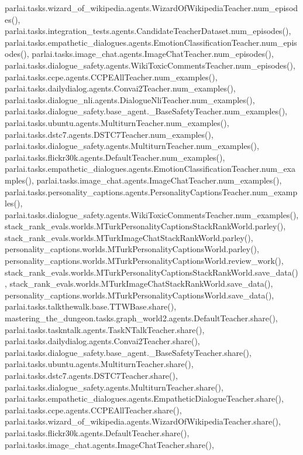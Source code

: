 parlai.\+tasks.\+wizard\+\_\+of\+\_\+wikipedia.\+agents.\+Wizard\+Of\+Wikipedia\+Teacher.\+num\+\_\+episodes(), parlai.\+tasks.\+integration\+\_\+tests.\+agents.\+Candidate\+Teacher\+Dataset.\+num\+\_\+episodes(), parlai.\+tasks.\+empathetic\+\_\+dialogues.\+agents.\+Emotion\+Classification\+Teacher.\+num\+\_\+episodes(), parlai.\+tasks.\+image\+\_\+chat.\+agents.\+Image\+Chat\+Teacher.\+num\+\_\+episodes(), parlai.\+tasks.\+dialogue\+\_\+safety.\+agents.\+Wiki\+Toxic\+Comments\+Teacher.\+num\+\_\+episodes(), parlai.\+tasks.\+ccpe.\+agents.\+C\+C\+P\+E\+All\+Teacher.\+num\+\_\+examples(), parlai.\+tasks.\+dailydialog.\+agents.\+Convai2\+Teacher.\+num\+\_\+examples(), parlai.\+tasks.\+dialogue\+\_\+nli.\+agents.\+Dialogue\+Nli\+Teacher.\+num\+\_\+examples(), parlai.\+tasks.\+dialogue\+\_\+safety.\+base\+\_\+agent.\+\_\+\+Base\+Safety\+Teacher.\+num\+\_\+examples(), parlai.\+tasks.\+ubuntu.\+agents.\+Multiturn\+Teacher.\+num\+\_\+examples(), parlai.\+tasks.\+dstc7.\+agents.\+D\+S\+T\+C7\+Teacher.\+num\+\_\+examples(), parlai.\+tasks.\+dialogue\+\_\+safety.\+agents.\+Multiturn\+Teacher.\+num\+\_\+examples(), parlai.\+tasks.\+flickr30k.\+agents.\+Default\+Teacher.\+num\+\_\+examples(), parlai.\+tasks.\+empathetic\+\_\+dialogues.\+agents.\+Emotion\+Classification\+Teacher.\+num\+\_\+examples(), parlai.\+tasks.\+image\+\_\+chat.\+agents.\+Image\+Chat\+Teacher.\+num\+\_\+examples(), parlai.\+tasks.\+personality\+\_\+captions.\+agents.\+Personality\+Captions\+Teacher.\+num\+\_\+examples(), parlai.\+tasks.\+dialogue\+\_\+safety.\+agents.\+Wiki\+Toxic\+Comments\+Teacher.\+num\+\_\+examples(), stack\+\_\+rank\+\_\+evals.\+worlds.\+M\+Turk\+Personality\+Captions\+Stack\+Rank\+World.\+parley(), stack\+\_\+rank\+\_\+evals.\+worlds.\+M\+Turk\+Image\+Chat\+Stack\+Rank\+World.\+parley(), personality\+\_\+captions.\+worlds.\+M\+Turk\+Personality\+Captions\+World.\+parley(), personality\+\_\+captions.\+worlds.\+M\+Turk\+Personality\+Captions\+World.\+review\+\_\+work(), stack\+\_\+rank\+\_\+evals.\+worlds.\+M\+Turk\+Personality\+Captions\+Stack\+Rank\+World.\+save\+\_\+data(), stack\+\_\+rank\+\_\+evals.\+worlds.\+M\+Turk\+Image\+Chat\+Stack\+Rank\+World.\+save\+\_\+data(), personality\+\_\+captions.\+worlds.\+M\+Turk\+Personality\+Captions\+World.\+save\+\_\+data(), parlai.\+tasks.\+talkthewalk.\+base.\+T\+T\+W\+Base.\+share(), mastering\+\_\+the\+\_\+dungeon.\+tasks.\+graph\+\_\+world2.\+agents.\+Default\+Teacher.\+share(), parlai.\+tasks.\+taskntalk.\+agents.\+Task\+N\+Talk\+Teacher.\+share(), parlai.\+tasks.\+dailydialog.\+agents.\+Convai2\+Teacher.\+share(), parlai.\+tasks.\+dialogue\+\_\+safety.\+base\+\_\+agent.\+\_\+\+Base\+Safety\+Teacher.\+share(), parlai.\+tasks.\+ubuntu.\+agents.\+Multiturn\+Teacher.\+share(), parlai.\+tasks.\+dstc7.\+agents.\+D\+S\+T\+C7\+Teacher.\+share(), parlai.\+tasks.\+dialogue\+\_\+safety.\+agents.\+Multiturn\+Teacher.\+share(), parlai.\+tasks.\+empathetic\+\_\+dialogues.\+agents.\+Empathetic\+Dialogue\+Teacher.\+share(), parlai.\+tasks.\+ccpe.\+agents.\+C\+C\+P\+E\+All\+Teacher.\+share(), parlai.\+tasks.\+wizard\+\_\+of\+\_\+wikipedia.\+agents.\+Wizard\+Of\+Wikipedia\+Teacher.\+share(), parlai.\+tasks.\+flickr30k.\+agents.\+Default\+Teacher.\+share(), parlai.\+tasks.\+image\+\_\+chat.\+agents.\+Image\+Chat\+Teacher.\+share(), 